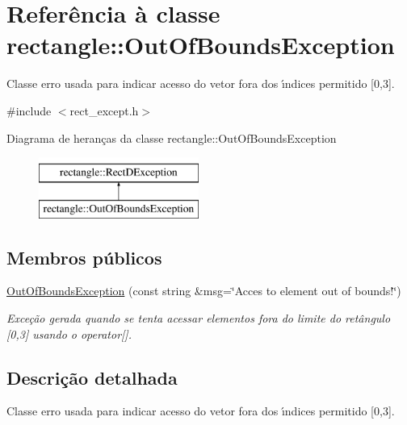 \hypertarget{classrectangle_1_1OutOfBoundsException}{\section{Referência à classe rectangle\-:\-:Out\-Of\-Bounds\-Exception}
\label{classrectangle_1_1OutOfBoundsException}
}


Classe erro usada para indicar acesso do vetor fora dos \'{\i}ndices permitido \mbox{[}0,3\mbox{]}.  




{\ttfamily \#include $<$rect\-\_\-except.\-h$>$}

Diagrama de heranças da classe rectangle\-:\-:Out\-Of\-Bounds\-Exception\begin{figure}[H]
\begin{center}
\leavevmode
\includegraphics[height=2.000000cm]{classrectangle_1_1OutOfBoundsException}
\end{center}
\end{figure}
\subsection*{Membros públicos}
\begin{DoxyCompactItemize}
\item 
\hyperlink{classrectangle_1_1OutOfBoundsException_a7380515d17520a742472bfc20fccd51f}{Out\-Of\-Bounds\-Exception} (const string \&msg=\char`\"{}Acces to element out of bounds!\char`\"{})
\begin{DoxyCompactList}\small\item\em Exce\c{c}\~{a}o gerada quando se tenta acessar elementos fora do limite do ret\^{a}ngulo \mbox{[}0,3\mbox{]} usando o operator\mbox{[}\mbox{]}. \end{DoxyCompactList}\end{DoxyCompactItemize}


\subsection{Descrição detalhada}
Classe erro usada para indicar acesso do vetor fora dos \'{\i}ndices permitido \mbox{[}0,3\mbox{]}. 

